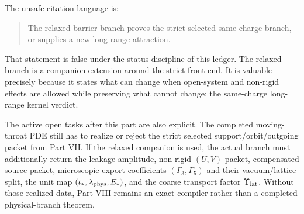 The unsafe citation language is:
\begin{quote}
The relaxed barrier branch proves the strict selected same-charge branch, or supplies a new long-range attraction.
\end{quote}
That statement is false under the status discipline of this ledger.  The relaxed branch is a companion extension around the strict front end.  It is valuable precisely because it states what can change when open-system and non-rigid effects are allowed while preserving what cannot change: the same-charge long-range kernel verdict.

The active open tasks after this part are also explicit.  The completed moving-throat PDE still has to realize or reject the strict selected support/orbit/outgoing packet from Part VII.  If the relaxed companion is used, the actual branch must additionally return the leakage amplitude, non-rigid \((U,V)\) packet, compensated source packet, microscopic export coefficients \((\Gamma_3,\Gamma_5)\) and their vacuum/lattice split, the unit map \((t_*,\lambda_{\rm phys},E_*)\), and the coarse transport factor \(\Upsilon_{\rm lat}\).  Without those realized data, Part VIII remains an exact compiler rather than a completed physical-branch theorem.
